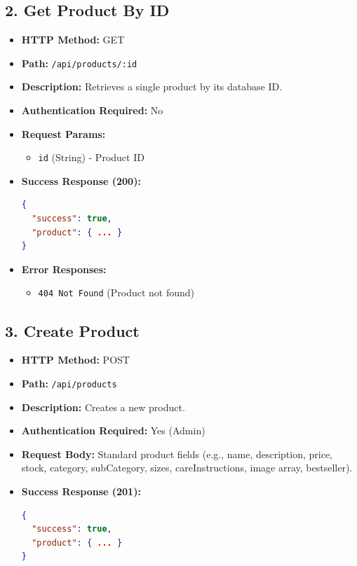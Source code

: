 \documentclass[12pt,a4paper]{article}
\begin{document}
\subsection{2. Get Product By ID}
\begin{itemize}
    \item \textbf{HTTP Method:} GET
    \item \textbf{Path:} \texttt{/api/products/:id}
    \item \textbf{Description:} Retrieves a single product by its database ID.
    \item \textbf{Authentication Required:} No
    \item \textbf{Request Params:}
    \begin{itemize}
        \item \texttt{id} (String) - Product ID
    \end{itemize}
    \item \textbf{Success Response (200):}
\begin{lstlisting}[language=json]
{
  "success": true,
  "product": { ... }
}
\end{lstlisting}
    \item \textbf{Error Responses:}
    \begin{itemize}
        \item \texttt{404 Not Found} (Product not found)
    \end{itemize}
\end{itemize}

\subsection{3. Create Product}
\begin{itemize}
    \item \textbf{HTTP Method:} POST
    \item \textbf{Path:} \texttt{/api/products}
    \item \textbf{Description:} Creates a new product.
    \item \textbf{Authentication Required:} Yes (Admin)
    \item \textbf{Request Body:} Standard product fields (e.g., name, description, price, stock, category, subCategory, sizes, careInstructions, image array, bestseller).
    \item \textbf{Success Response (201):}
\begin{lstlisting}[language=json]
{
  "success": true,
  "product": { ... }
}
\end{lstlisting}
\end{itemize}
\end{document}
